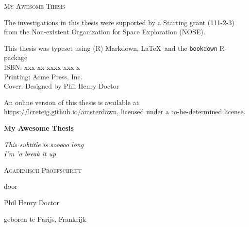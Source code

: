 \documentclass[12pt,english,a4paper,oneside,]{book} %
\theoremstyle{definition}
\theoremstyle{definition}
\theoremstyle{definition}
\theoremstyle{remark}
\begin{document}
\frontmatter
\thispagestyle{empty}
\def\drop{.1\textheight}

\vspace*{\drop}
\begin{center}
\Huge \textsc{My Awesome Thesis}
\end{center}

\clearpage
\thispagestyle{empty}
\vspace*{\fill}
\begingroup %
\small
\setlength{\parskip}{\baselineskip} %
\setlength\parindent{0pt} %
The investigations in this thesis were supported by a Starting grant (111-2-3) from 
the Non-existent Organization for Space Exploration (NOSE).

This thesis was typeset using (R) Markdown, \LaTeX\ and the \verb+bookdown+ R-package
\\ ISBN: xxx-xx-xxxx-xxx-x\\ Printing: Acme Press, Inc.\\ Cover: Designed by Phil Henry Doctor

An online version of this thesis is available at \url{https://lcreteig.github.io/amsterdown}, licensed under a to-be-determined license.
\endgroup

\clearpage
\thispagestyle{empty}
\vspace*{\drop}
\begin{center}
\Huge\textbf{My Awesome Thesis}\par
\vspace{\baselineskip}
\Large\textit{This subtitle is sooooo long\\
I'm 'a break it up}\par
\vfill %
\large \textsc{Academisch Proefschrift}\par
\vspace{\baselineskip}
\par %
\vspace{\baselineskip}
{\large door}\par
\vspace{\baselineskip}
{\Large Phil Henry Doctor}\par
\vspace{\baselineskip}
{\large geboren te Parijs, Frankrijk}
\end{center}
\end{document}
